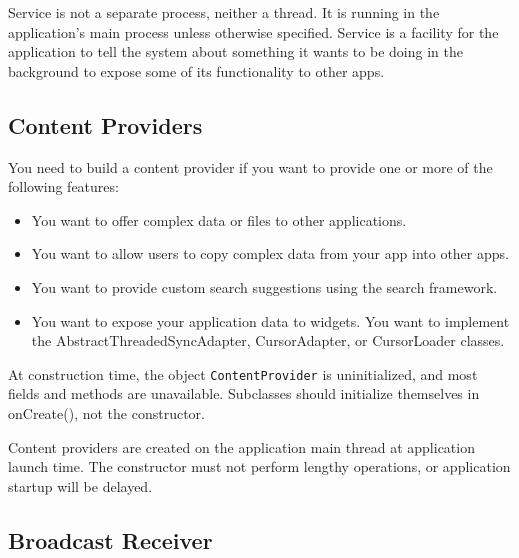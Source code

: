 
Service is not a separate process, neither a thread. It is running in the
application's main process unless otherwise specified. Service is a facility for
the application to tell the system about something it wants to be doing in the
background to expose some of its functionality to other apps.


\subsection{Content Providers}

You need to build a content provider if you want to provide one or more of the
following features:
\begin{itemize}
\item You want to offer complex data or files to other applications.
\item You want to allow users to copy complex data from your app into other
  apps.
\item You want to provide custom search suggestions using the search framework.
\item You want to expose your application data to widgets. You want to implement
  the AbstractThreadedSyncAdapter, CursorAdapter, or CursorLoader classes.
\end{itemize}

At construction time, the object \texttt{ContentProvider} is uninitialized, and
most fields and methods are unavailable. Subclasses should initialize themselves
in onCreate(), not the constructor.

Content providers are created on the application main thread at application
launch time. The constructor must not perform lengthy operations, or application
startup will be delayed.


\subsection{Broadcast Receiver}



  


